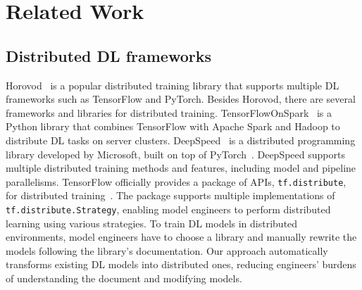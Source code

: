 \section{Related Work}\label{sec:related}

\subsection{Distributed DL frameworks}

Horovod~\cite{sergeev2018horovod} is a popular distributed training library that
supports multiple DL frameworks such as TensorFlow and PyTorch.
Besides Horovod, there are several frameworks and libraries for distributed
training.
TensorFlowOnSpark~\cite{tfonspark} is a Python library that
combines TensorFlow with Apache Spark and Hadoop to distribute
DL tasks on server clusters. 
DeepSpeed~\cite{deepspeed} is a distributed programming library developed by
Microsoft, built on top of PyTorch~\cite{pytorch2019}.  
DeepSpeed supports multiple distributed training methods and features,
including model and pipeline parallelisms. 
TensorFlow officially provides a package of APIs, {\tt tf.distribute}, for
distributed training~\cite{tfdistributed}.
The package supports multiple implementations of {\tt tf.distribute.Strategy},
enabling model engineers to perform distributed learning using various
strategies.
To train DL models in distributed environments, model engineers have to choose
a library and manually rewrite the models following the library's documentation.
Our approach automatically transforms existing DL models into distributed ones,
reducing engineers' burdens of understanding the document and modifying models.


